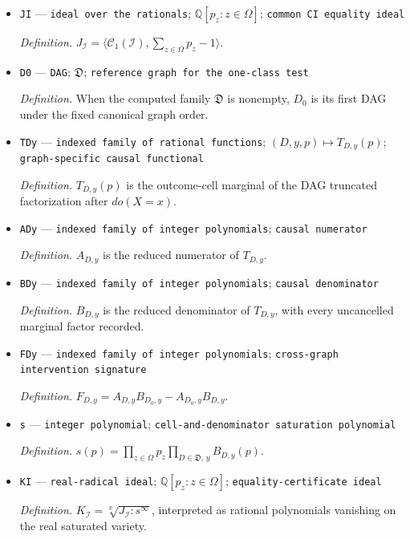 \documentclass{article}
\begin{document}
\begin{itemize}
  \item \texttt{JI} --- \texttt{ideal over the rationals}; \(\mathbb Q[p_z:z\in\Omega]\); \texttt{common CI equality ideal}
  \par\smallskip\noindent\emph{Definition.} \(J_{\mathcal I}=\langle\mathcal C_1(\mathcal I),\sum_{z\in\Omega}p_z-1\rangle\).
  \item \texttt{D0} --- \texttt{DAG}; \(\mathfrak D\); \texttt{reference graph for the one-\allowbreak{}class test}
  \par\smallskip\noindent\emph{Definition.} When the computed family \(\mathfrak D\) is nonempty, \(D_0\) is its first DAG under the fixed canonical graph order.
  \item \texttt{TDy} --- \texttt{indexed family of rational functions}; \((D,y,p)\mapsto T_{D,y}(p)\); \texttt{graph-\allowbreak{}specific causal functional}
  \par\smallskip\noindent\emph{Definition.} \(T_{D,y}(p)\) is the outcome-cell marginal of the DAG truncated factorization after \(do(X=x)\).
  \item \texttt{ADy} --- \texttt{indexed family of integer polynomials}; \texttt{causal numerator}
  \par\smallskip\noindent\emph{Definition.} \(A_{D,y}\) is the reduced numerator of \(T_{D,y}\).
  \item \texttt{BDy} --- \texttt{indexed family of integer polynomials}; \texttt{causal denominator}
  \par\smallskip\noindent\emph{Definition.} \(B_{D,y}\) is the reduced denominator of \(T_{D,y}\), with every uncancelled marginal factor recorded.
  \item \texttt{FDy} --- \texttt{indexed family of integer polynomials}; \texttt{cross-\allowbreak{}graph intervention signature}
  \par\smallskip\noindent\emph{Definition.} \(F_{D,y}=A_{D,y}B_{D_0,y}-A_{D_0,y}B_{D,y}\).
  \item \texttt{s} --- \texttt{integer polynomial}; \texttt{cell-\allowbreak{}and-\allowbreak{}denominator saturation polynomial}
  \par\smallskip\noindent\emph{Definition.} \(s(p)=\prod_{z\in\Omega}p_z\prod_{D\in\mathfrak D,\,y}B_{D,y}(p)\).
  \item \texttt{KI} --- \texttt{real-\allowbreak{}radical ideal}; \(\mathbb Q[p_z:z\in\Omega]\); \texttt{equality-\allowbreak{}certificate ideal}
  \par\smallskip\noindent\emph{Definition.} \(K_{\mathcal I}=\sqrt[\mathbb R]{J_{\mathcal I}:s^{\infty}}\), interpreted as rational polynomials vanishing on the real saturated variety.

\end{itemize}
\end{document}
